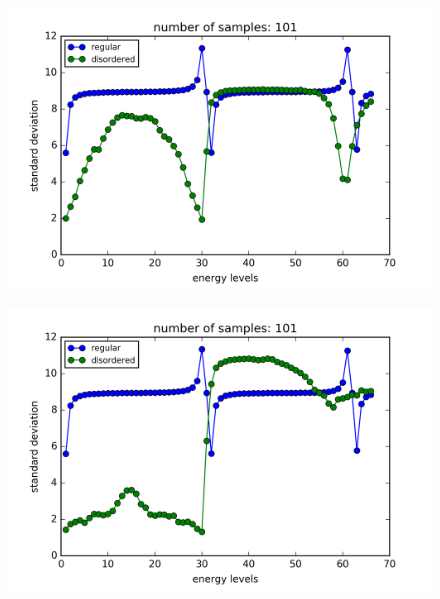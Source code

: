 \begin{figure}[!htbh]
\centering
\begin{minipage}{.45\textwidth}
  \centering
  \includegraphics[width=1.1\linewidth]{standardDeviation/N_31_100a10_0_1_1_p_0_5.png}
  \label{fig:disordered sys num 1}
\end{minipage}\qquad
\begin{minipage}{.45\textwidth}
  \centering
  \includegraphics[width=1.1\linewidth]{standardDeviation/N_31_100a10_0_1_5_p_0_5.png}
  \label{fig:disordered sys num 2}
\end{minipage}
\end{figure}

